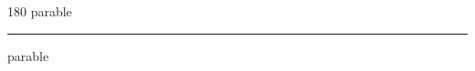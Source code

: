 
\begin{frame}
\begin{center}
\begin{turn}{180}
{\fontsize{2.5cm}{1em}\selectfont parable}
\end{turn}
\vspace{1em}\par  
\hrule
\vspace{1em}\par  
{\fontsize{2.5cm}{1em}\selectfont parable}
\end{center}
\end{frame}
